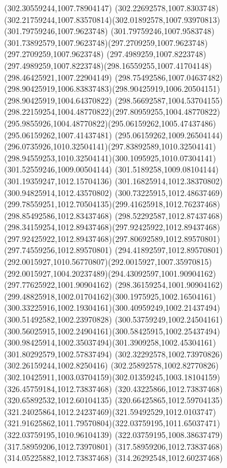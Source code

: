 {{		\lineto(302.30559244,1007.78904147)
		\lineto(302.22692578,1007.8303748)
		\curveto(302.21759244,1007.83570814)(302.01892578,1007.93970813)(301.79759246,1007.9623748)
		\lineto(301.79759246,1007.9583748)
		\curveto(301.73892579,1007.9623748)(297.2709259,1007.9623748)(297.2709259,1007.9623748)
		\lineto(297.4989259,1007.8223748)
		\curveto(297.4989259,1007.8223748)(298.16559255,1007.41704148)(298.46425921,1007.22904149)
		\curveto(298.75492586,1007.04637482)(298.90425919,1006.83837483)(298.90425919,1006.20504151)
		\lineto(298.90425919,1004.64370822)
		\curveto(298.56692587,1004.53704155)(298.22159254,1004.48770822)(297.80959255,1004.48770822)
		\curveto(295.9855926,1004.48770822)(295.06159262,1005.47437486)(295.06159262,1007.41437481)
		\curveto(295.06159262,1009.26504144)(296.0735926,1010.32504141)(297.83892589,1010.32504141)
		\curveto(298.94559253,1010.32504141)(300.1095925,1010.07304141)(301.52559246,1009.00504144)
		\lineto(301.5189258,1009.08104144)
		\lineto(301.19359247,1012.15704136)
		\lineto(301.16825914,1012.38370802)
		\lineto(300.94825914,1012.43570802)
		\lineto(300.73225915,1012.48637469)
		\curveto(299.78559251,1012.70504135)(299.41625918,1012.76237468)(298.85492586,1012.83437468)
		\curveto(298.52292587,1012.87437468)(298.34159254,1012.89437468)(297.92425922,1012.89437468)
		\curveto(297.92425922,1012.89437468)(297.80692589,1012.89570801)(297.74559256,1012.89570801)
		\curveto(294.41892597,1012.89570801)(292.0015927,1010.56770807)(292.0015927,1007.35970815)
		\curveto(292.0015927,1004.20237489)(294.43092597,1001.90904162)(297.77625922,1001.90904162)
		\curveto(298.36159254,1001.90904162)(299.48825918,1002.01704162)(300.1975925,1002.16504161)
		\curveto(300.33225916,1002.19304161)(300.40959249,1002.21437494)(300.51492582,1002.23970828)
		\curveto(300.53759249,1002.24504161)(300.56025915,1002.24904161)(300.58425915,1002.25437494)
		\curveto(300.98425914,1002.35037494)(301.3909258,1002.45304161)(301.80292579,1002.57837494)
		\lineto(302.32292578,1002.73970826)
		\lineto(302.26159244,1002.8250416)
		\curveto(302.25892578,1002.82770826)(302.10425911,1003.03704159)(302.01359245,1003.18104159)
		\moveto(326.45759184,1012.73837468)
		\lineto(320.43225866,1012.73837468)
		\lineto(320.65892532,1012.60104135)
		\curveto(320.66425865,1012.59704135)(321.24025864,1012.24237469)(321.59492529,1012.0103747)
		\curveto(321.91625862,1011.79570804)(322.03759195,1011.65037471)(322.03759195,1010.96104139)
		\lineto(322.03759195,1008.38637479)
		\lineto(317.58959206,1012.73970801)
		\lineto(317.58959206,1012.73837468)
		\lineto(314.05225882,1012.73837468)
		\lineto(314.26292548,1012.60237468)
}}
